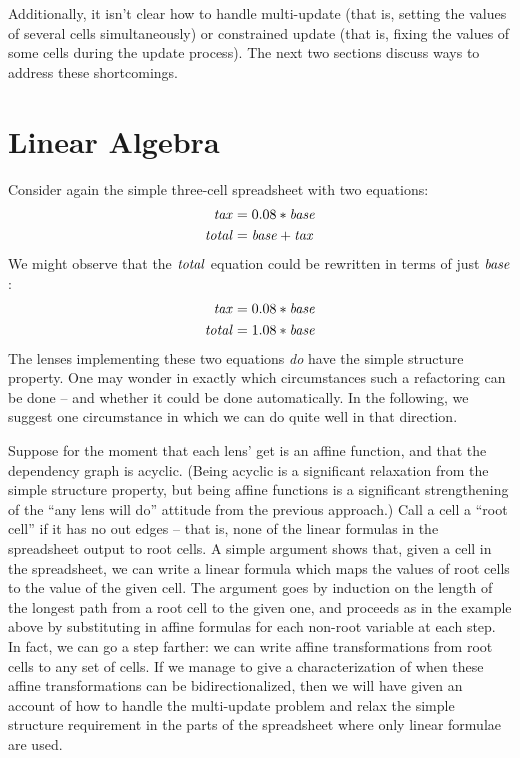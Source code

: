 \documentclass{article}
\begin{document}
Additionally, it isn't clear how to handle multi-update (that is, setting
the values of several cells simultaneously) or constrained update (that is,
fixing the values of some cells during the update process). The next two
sections discuss ways to address these shortcomings.

\section{Linear Algebra}
\label{sec:global-analysis}
Consider again the simple three-cell spreadsheet with two equations:
\begin{align*}
    \mathit{tax} &= 0.08*\mathit{base} \\
    \mathit{total} &= \mathit{base}+\mathit{tax}
\end{align*}
We might observe that the $\mathit{total}$ equation could be rewritten in terms of
just $\mathit{base}$:
\begin{align*}
    \mathit{tax}   &= 0.08*\mathit{base} \\
    \mathit{total} &= 1.08*\mathit{base}
\end{align*}
The lenses implementing these two equations \emph{do} have the simple
structure property. One may wonder in exactly which circumstances such a
refactoring can be done -- and whether it could be done automatically. In
the following, we suggest one circumstance in which we can do quite well in
that direction.

Suppose for the moment that each lens' get is an affine function, and that
the dependency graph is acyclic. (Being acyclic is a significant relaxation
from the simple structure property, but being affine functions is a
significant strengthening of the ``any lens will do'' attitude from the
previous approach.) Call a cell a ``root cell'' if it has no out edges --
that is, none of the linear formulas in the spreadsheet output to root
cells. A simple argument shows that, given a cell in the spreadsheet, we
can write a linear formula which maps the values of root cells to the value
of the given cell. The argument goes by induction on the length of the
longest path from a root cell to the given one, and proceeds as in the
example above by substituting in affine formulas for each non-root variable
at each step. In fact, we can go a step farther: we can write affine
transformations from root cells to any set of cells. If we manage to give a
characterization of when these affine transformations can be
bidirectionalized, then we will have given an account of how to handle the
multi-update problem and relax the simple structure requirement in the parts
of the spreadsheet where only linear formulae are used.
\end{document}

